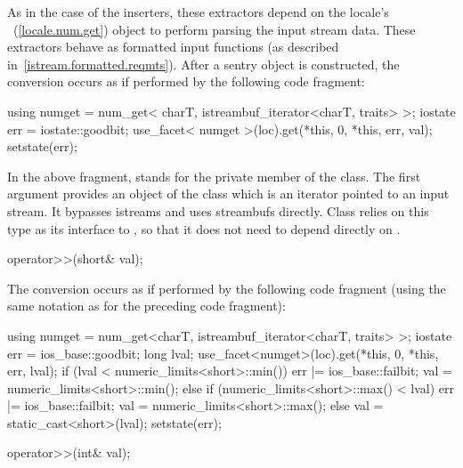 \begin{itemdescr}
\pnum
As in the case of the inserters, these extractors depend on the
locale's
~(\ref{locale.num.get}) object to perform parsing the input
stream data.
These extractors behave as formatted input functions (as described in~\ref{istream.formatted.reqmts}).  After a sentry object is constructed, the
conversion occurs as if performed by the following code fragment:

\begin{codeblock}
using numget = num_get< charT, istreambuf_iterator<charT, traits> >;
iostate err = iostate::goodbit;
use_facet< numget >(loc).get(*this, 0, *this, err, val);
setstate(err);
\end{codeblock}

In the above fragment,
stands for the private member of the
class.
\enternote
The first argument provides an object of the
class which is an iterator pointed to an input stream.
It bypasses istreams and uses streambufs directly.
\exitnote
Class
relies on this
type as its interface to
,
so that it does not need to depend directly on
.
\end{itemdescr}

%
%
\begin{itemdecl}
operator>>(short& val);
\end{itemdecl}

\begin{itemdescr}
\pnum
The conversion occurs as if performed by the following code fragment
(using the same notation as for the preceding code fragment):
\begin{codeblock}
using numget = num_get<charT, istreambuf_iterator<charT, traits> >;
iostate err = ios_base::goodbit;
long lval;
use_facet<numget>(loc).get(*this, 0, *this, err, lval);
if (lval < numeric_limits<short>::min()) {
  err |= ios_base::failbit;
  val = numeric_limits<short>::min();
} else if (numeric_limits<short>::max() < lval) {
  err |= ios_base::failbit;
  val = numeric_limits<short>::max();
}  else
  val = static_cast<short>(lval);
setstate(err);
\end{codeblock}
\end{itemdescr}

%
%
\begin{itemdecl}
operator>>(int& val);
\end{itemdecl}

